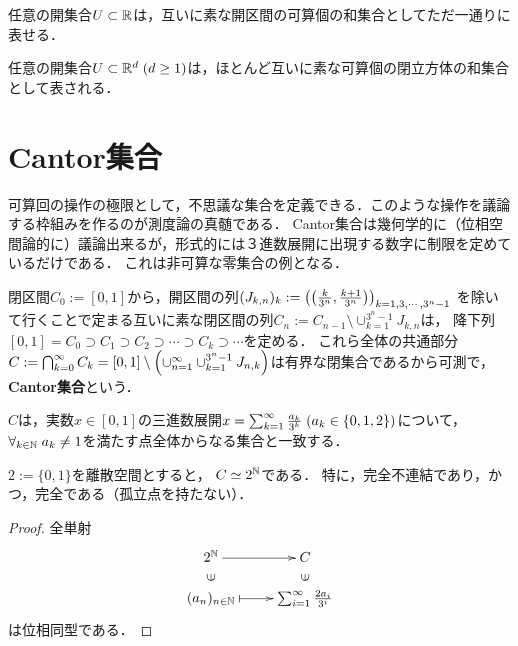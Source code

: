 \documentclass[uplatex, dvipdfmx]{jsreport}
\begin{document}
\begin{proposition}
    任意の開集合$U\subset\mathbb{R}$は，互いに素な開区間の可算個の和集合としてただ一通りに表せる．
\end{proposition}

\begin{proposition}
    任意の開集合$U\subset\mathbb{R}^d\;(d\ge 1)$は，ほとんど互いに素な可算個の閉立方体の和集合として表される．
\end{proposition}

\section{Cantor集合}

\begin{tcolorbox}[colframe=ForestGreen, colback=ForestGreen!10!white,breakable,colbacktitle=ForestGreen!40!white,coltitle=black,fonttitle=\bfseries\sffamily,
title=]
    可算回の操作の極限として，不思議な集合を定義できる．このような操作を議論する枠組みを作るのが測度論の真髄である．
    Cantor集合は幾何学的に（位相空間論的に）議論出来るが，形式的には３進数展開に出現する数字に制限を定めているだけである．
    これは非可算な零集合の例となる．
\end{tcolorbox}

\begin{definition}
    閉区間$C_0:=[0,1]$から，開区間の列$(J_{k,n})_{k}:=\left(\left(\frac{k}{3^n},\frac{k+1}{3^n}\right)\right)_{k=1,3,\cdots,3^n-1}$
    を除いて行くことで定まる互いに素な閉区間の列$C_n:=C_{n-1}\setminus\cup_{k=1}^{3^n-1}J_{k,n}$は，
    降下列$[0,1]=C_0\supset C_1\supset C_2\supset\cdots\supset C_k\supset\cdots$を定める．
    これら全体の共通部分$C:=\bigcap^\infty_{k=0}C_k=[0,1]\setminus\left(\cup_{n=1}^\infty\cup_{k=1}^{3^n-1}J_{n,k}\right)$は有界な閉集合であるから可測で，\textbf{Cantor集合}という．
\end{definition}

\begin{lemma}[三進数展開としての特徴付け]
    $C$は，実数$x\in[0,1]$の三進数展開$x=\sum_{k=1}^\infty\frac{a_k}{3^k}\;(a_k\in\{0,1,2\})$について，$\forall_{k\in\mathbb{N}}\;a_k\ne 1$を満たす点全体からなる集合と一致する．
\end{lemma}

\begin{proposition}[Cantor空間の位相]
    $2:=\{0,1\}$を離散空間とすると，
    $C\simeq 2^{\mathbb{N}}$である．
    特に，完全不連結であり，かつ，完全である（孤立点を持たない）．
\end{proposition}
\begin{proof}
    全単射
    \[\xymatrix@R-2pc{
        2^\N\ar[r]&C\\
        \rotatebox[origin=c]{90}{$\in$}&\rotatebox[origin=c]{90}{$\in$}\\
        (a_n)_{n\in\N}\ar@{|->}[r]&\sumi\frac{2a_i}{3^i}
    }\]
    は位相同型である．
\end{proof}
\end{document}
